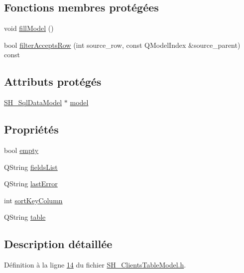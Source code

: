 \subsection*{Fonctions membres protégées}
\begin{DoxyCompactItemize}
\item 
void \hyperlink{classSH__ClientsTableModel_ae26e1b2a4e4ae52efbc0929324bf01ed}{fill\-Model} ()
\item 
bool \hyperlink{classSH__ExtendedProxyModel_a5c9a68f10afb83af24896beac56e0ae3}{filter\-Accepts\-Row} (int source\-\_\-row, const Q\-Model\-Index \&source\-\_\-parent) const 
\end{DoxyCompactItemize}
\subsection*{Attributs protégés}
\begin{DoxyCompactItemize}
\item 
\hyperlink{classSH__SqlDataModel}{S\-H\-\_\-\-Sql\-Data\-Model} $\ast$ \hyperlink{classSH__ExtendedProxyModel_a8c8b8930c6b1abd9bbb1dce1fdc9690b}{model}
\end{DoxyCompactItemize}
\subsection*{Propriétés}
\begin{DoxyCompactItemize}
\item 
bool \hyperlink{classSH__ExtendedProxyModel_a9e22d17af7776aca8052084cc33c3442}{empty}
\item 
Q\-String \hyperlink{classSH__ExtendedProxyModel_a15e779ba92384a57442d6bd79ef3d1d1}{fields\-List}
\item 
Q\-String \hyperlink{classSH__ExtendedProxyModel_a1597853dfae8c3972ef3396293d5d0fc}{last\-Error}
\item 
int \hyperlink{classSH__ExtendedProxyModel_a47e2d0b99b84fb066438db667dd1ad26}{sort\-Key\-Column}
\item 
Q\-String \hyperlink{classSH__ExtendedProxyModel_a7eef4557a77444e9ce5c24c180392bfa}{table}
\end{DoxyCompactItemize}


\subsection{Description détaillée}


Définition à la ligne \hyperlink{SH__ClientsTableModel_8h_source_l00014}{14} du fichier \hyperlink{SH__ClientsTableModel_8h_source}{S\-H\-\_\-\-Clients\-Table\-Model.\-h}.



